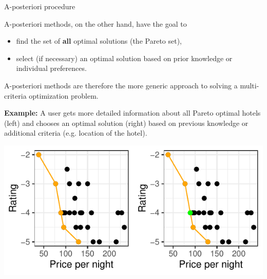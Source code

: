 \begin{frame}[allowframebreaks]{A-posteriori procedure}

A-posteriori methods, on the other hand, have the goal to

\begin{itemize}
\item find the set of \textbf{all} optimal solutions (the Pareto set),
\item select (if necessary) an optimal solution based on prior knowledge or individual preferences.
\end{itemize}

A-posteriori methods are therefore the more generic approach to solving a multi-criteria optimization problem.


\framebreak

\textbf{Example:} A user gets more detailed information about all Pareto optimal hotels (left) and chooses an optimal solution (right) based on previous knowledge or additional criteria (e.g. location of the hotel).

\vspace*{0.1cm}


\centering \includegraphics[scale=1]{images/expedia-11-1}


\end{frame}


